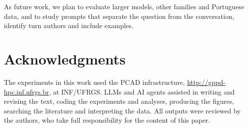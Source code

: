 \documentclass[12pt]{article}
\begin{document}
As future work, we plan to evaluate larger models, other families and Portuguese data, and to study prompts that separate the question from the conversation, identify turn authors and include examples.
\section*{Acknowledgments}
The experiments in this work used the PCAD infrastructure, \url{http://gppd-hpc.inf.ufrgs.br}, at INF/UFRGS. LLMs and AI agents assisted in writing and revising the text, coding the experiments and analyses, producing the figures, searching the literature and interpreting the data. All outputs were reviewed by the authors, who take full responsibility for the content of this paper.



\end{document}
